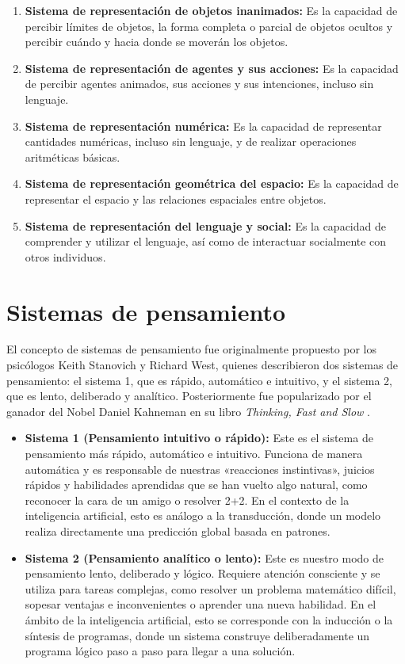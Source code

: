 \documentclass[11pt,a4paper,spanish]{book}
\numberwithin{equation}{chapter}
\numberwithin{figure}{chapter}
\begin{document}
\begin{enumerate}
\item \textbf{Sistema de representación de objetos inanimados:} Es la capacidad de percibir límites de objetos, la forma completa o parcial de objetos ocultos y percibir cuándo y hacia donde se moverán los objetos.
\item \textbf{Sistema de representación de agentes y sus acciones:} Es la capacidad de percibir agentes animados, sus acciones y sus intenciones, incluso sin lenguaje.
\item \textbf{Sistema de representación numérica:} Es la capacidad de representar cantidades numéricas, incluso sin lenguaje, y de realizar operaciones aritméticas básicas.
\item \textbf{Sistema de representación geométrica del espacio:} Es la capacidad de representar el espacio y las relaciones espaciales entre objetos.
\item \textbf{Sistema de representación del lenguaje y social:} Es la capacidad de comprender y utilizar el lenguaje, así como de interactuar socialmente con otros individuos.
\end{enumerate}

\section{Sistemas de pensamiento}

El concepto de sistemas de pensamiento fue originalmente propuesto por los psicólogos Keith Stanovich y Richard West, quienes describieron 
dos sistemas de pensamiento: el sistema 1, que es rápido, automático e intuitivo, y el sistema 2, que es lento, deliberado y analítico. Posteriormente fue popularizado
por el ganador del Nobel Daniel Kahneman en su libro \textit{Thinking, Fast and Slow} \citeyear{kahneman2011thinking}.

\begin{itemize}
	\item \textbf{Sistema 1 (Pensamiento intuitivo o rápido):} Este es el sistema de pensamiento más rápido, automático e intuitivo. Funciona de manera automática 
	y es responsable de nuestras «reacciones instintivas», juicios rápidos y habilidades aprendidas que se han vuelto algo natural, como reconocer la cara de un amigo o resolver 
	2+2. En el contexto de la inteligencia artificial, esto es análogo a la transducción, donde un modelo realiza directamente una predicción global basada en patrones.
	\item \textbf{Sistema 2 (Pensamiento analítico o lento):} Este es nuestro modo de pensamiento lento, deliberado y lógico. Requiere atención consciente y se utiliza para 
	tareas complejas, como resolver un problema matemático difícil, sopesar ventajas e inconvenientes o aprender una nueva habilidad. En el ámbito de la inteligencia artificial, 
	esto se corresponde con la inducción o la síntesis de programas, donde un sistema construye deliberadamente un programa lógico paso a paso para llegar a una solución.
\end{itemize}
\end{document}
